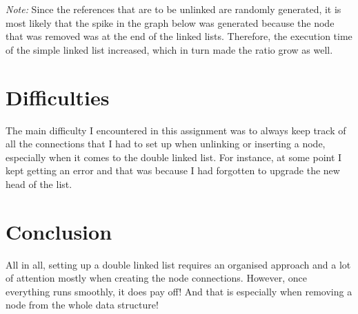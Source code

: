 \documentclass[a4paper,11pt]{article}
\begin{document}
\textit{Note: } Since the references that are to be unlinked are randomly generated, it is most likely that the spike in the graph below was generated because the node that was removed was at the end of the linked lists. Therefore, the execution time of the simple linked list increased, which in turn made the ratio grow as well.

\section*{Difficulties} 

The main difficulty I encountered in this assignment was to always keep track of all the connections
that I had to set up when unlinking or inserting a node, especially when it comes to the 
double linked list. For instance, at some point I kept getting an error and that was because I had forgotten to upgrade the new head of the list.

\section*{Conclusion}

All in all, setting up a double linked list requires an organised approach and a lot of attention mostly when creating the node connections. However, once everything runs smoothly, it does pay off! And that is especially when removing a node from the whole data structure!
\end{document}
